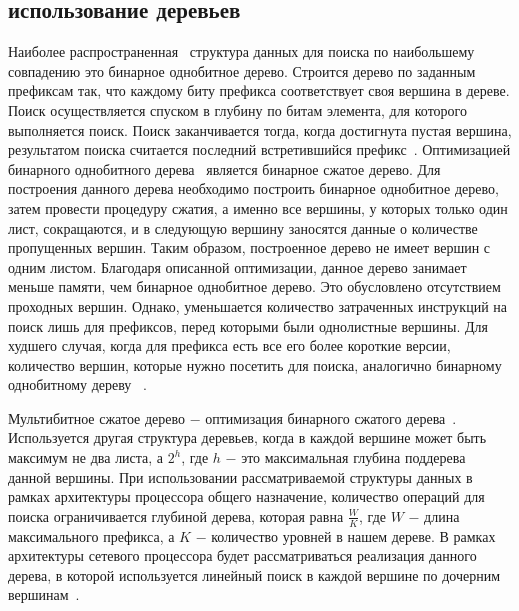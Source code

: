\documentclass[9pt,a4paper]{article}
\begin{document}
    \subsection{использование деревьев}
        \label{section:bctrev}
            Наиболее распространенная~\cite{behdadfar2009scalar} структура данных для поиска по 
            наибольшему совпадению это бинарное однобитное дерево. 
            Строится дерево по заданным префиксам так, что каждому биту префикса соответствует своя вершина в дереве. 
            Поиск осуществляется спуском в глубину по битам элемента, для которого выполняется поиск. 
            Поиск заканчивается тогда, когда достигнута пустая вершина, результатом поиска считается последний встретившийся префикс~\cite{chao2007high:1}.
            Оптимизацией бинарного однобитного дерева~\cite{ruiz2001survey} является бинарное сжатое дерево. 
            Для построения данного дерева необходимо построить бинарное однобитное дерево, 
            затем провести процедуру сжатия, а именно все вершины, у которых только один лист, 
            сокращаются, и в следующую вершину заносятся данные о количестве пропущенных вершин. 
            Таким образом, построенное дерево не имеет вершин с одним листом. 
            Благодаря описанной оптимизации, данное дерево занимает меньше памяти, 
            чем бинарное однобитное дерево. Это обусловлено отсутствием проходных вершин. 
            Однако, уменьшается количество затраченных инструкций на поиск лишь 
            для префиксов, перед которыми были однолистные вершины. Для худшего случая, когда для префикса есть все его более короткие версии, количество вершин, 
            которые нужно посетить для поиска, аналогично бинарному однобитному дереву ~\cite{ruiz2001survey}. 

            Мультибитное сжатое дерево $-$ оптимизация бинарного сжатого дерева~\cite{berger2003ip}.
            Используется другая структура деревьев, когда в каждой вершине может быть максимум не два листа, 
            а {\ttfamily $2^h$}, где {\ttfamily $h$} $-$ это максимальная глубина поддерева данной вершины.
            При использовании рассматриваемой структуры данных в рамках архитектуры процессора общего назначение, 
            количество операций для поиска ограничивается глубиной дерева,
            которая равна {\ttfamily $\frac{W}{K}$}, где {\ttfamily $W$} $-$ длина максимального префикса, 
            а {\ttfamily $K$} $-$ количество уровней в нашем дереве.
            В рамках архитектуры сетевого процессора будет рассматриваться реализация данного дерева, 
            в которой используется линейный поиск в каждой вершине по дочерним вершинам~\cite{berger2003ip}.
                    
\end{document}
